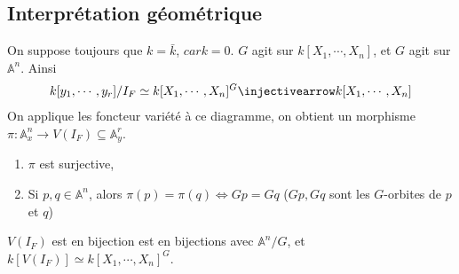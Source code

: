         \subsection{Interprétation géométrique}
            On suppose toujours que $k = \bar k$, $car k = 0$. $G$ agit sur $k[X_1, \cdots, X_n]$, et $G$ agit sur $\mathbb{A}^n$. Ainsi
            \begin{align*}
                k[y_1, \cdots, y_r]/I_F \simeq k[X_1, \cdots, X_n]^G \injectivearrow k[X_1, \cdots, X_n]
            \end{align*}
            On applique les foncteur variété à ce diagramme, on obtient un morphisme $\pi : \mathbb{A}^n_x \to V(I_F) \subseteq \mathbb{A}^r_y$.
            \begin{theo}
                \begin{enumerate}
                    \item $\pi$ est surjective,
                    \item Si $p,q \in \mathbb{A}^n$, alors $\pi(p) = \pi(q) \iff Gp = Gq$ ($Gp,Gq$ sont les $G$-orbites de $p$ et $q$)
                \end{enumerate}
            \end{theo}
            \begin{remq}
                $V(I_F)$ est en bijection est en bijections avec $\mathbb{A}^n/G$, et $k[V(I_F)] \simeq k[X_1, \cdots, X_n]^G$.
            \end{remq}
